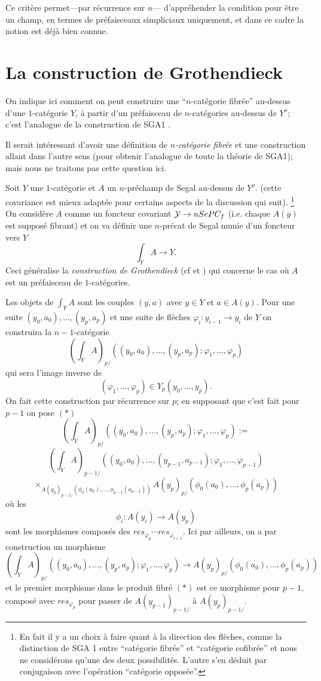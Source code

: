 \documentclass[12pt]{article}
\newcommand{\numero}[1]{\newpage\section{#1}}
\newcommand{\Yy}{{\cal Y}}
\begin{document}
Ce crit\`ere permet---par r\'ecurrence sur $n$--- d'appr\'ehender la condition
pour
\^etre un champ,  en termes de pr\'efaisceaux simpliciaux uniquement, et
dans ce cadre la
notion est d\'ej\`a bien connue.




\numero{La construction de Grothendieck}

\label{gropage}

On indique ici comment on peut construire une ``$n$-cat\'egorie fibr\'ee''
au-dessus
d'une $1$-cat\'egorie $Y$, \`a partir d'un pr\'efaisceau de $n$-cat\'egories
au-dessus de $Y^o$; c'est l'analogue de la construction de SGA1 \cite{SGA1}.

Il serait int\'eressant d'avoir une d\'efinition de
{\em $n$-cat\'egorie fibr\'ee} et une construction allant dans
l'autre sens (pour obtenir l'analogue de toute la th\'eorie de SGA1);
mais nous ne traitons pas cette question ici.

Soit $Y$ une $1$-cat\'egorie et
$A$ un $n$-pr\'echamp de Segal au-dessus de $Y^o$.
(cette covariance
est mieux adapt\'ee pour
certains aspects de la discussion
qui suit).
\footnote{En fait il y a un choix \`a faire quant \`a la direction des
fl\`eches, comme la distinction de SGA 1 entre ``cat\'egorie fibr\'ee'' et
``cat\'egorie cofibr\'ee'' et nous ne consid\'erons qu'une des
deux possibilit\'es.
L'autre s'en d\'eduit par conjugaison avec l'op\'eration
``cat\'egorie oppos\'ee''.}
On consid\`ere $A$ comme un foncteur covariant $\Yy
\rightarrow nSePC_f$ (i.e. chaque $A(y)$ est suppos\'e fibrant) et on va
d\'efinir une $n$-pr\'ecat de Segal munie d'un foncteur vers $Y$
$$
\int _YA \rightarrow Y.
$$
Ceci g\'en\'eralise la {\em
construction de Grothendieck} (cf \cite{ThomasonLimits} et \cite{DwyerKan2}) qui
concerne le cas o\`u $A$ est un pr\'efaisceau de $1$-cat\'egories.

Les objets de $\int _YA$ sont les couples $(y,a)$ avec $y\in Y$ et
$a\in A(y)$. Pour une suite $(y_0,a_0),\ldots , (y_p,a_p)$
et une suite de fl\`eches $\varphi _i : y_{i-1}\rightarrow y_i$ de $Y$ on
construira la $n-1$-cat\'egorie
$$
(\int _YA)_{p/}((y_0,a_0),\ldots , (y_p,a_p); \varphi _1,\ldots , \varphi _p)
$$
qui sera l'image inverse de
$$
(\varphi _1,\ldots , \varphi _p)\in Y_{p}(y_0,\ldots , y_p).
$$
On fait cette construction par r\'ecurrence sur $p$; en supposant que c'est fait
pour $p-1$ on pose $(\ast )$
$$
(\int _YA)_{p/}((y_0,a_0),\ldots , (y_p,a_p); \varphi _1,\ldots , \varphi _p)
:=
$$
$$
(\int _YA)_{p-1/}((y_0,a_0),\ldots , (y_{p-1},a_{p-1});
\varphi _1,\ldots , \varphi
_{p-1})
$$
$$
\times _{A(y_{p})_{p-1/}(\phi _0(a_0), \ldots , \phi _{p-1}(a_{p-1}))}
A(y_{p})_{p/}(\phi _0(a_0), \ldots , \phi _{p}(a_{p}))
$$
o\`u les
$$
\phi _i : A(y_i)\rightarrow A(y_p)
$$
sont les morphismes compos\'es des $res_{\varphi _p}\cdots res _{\varphi
_{i+1}}$. Ici par ailleurs, on a par construction un morphisme
$$
(\int _YA)_{p/}((y_0,a_0),\ldots , (y_p,a_p); \varphi _1,\ldots , \varphi _p)
\rightarrow
A(y_{p})_{p/}(\phi _0(a_0), \ldots , \phi _{p}(a_{p}))
$$
et le premier morphisme dans le produit fibr\'e $(\ast )$ est ce morphisme pour
$p-1$, compos\'e avec $res_{\varphi _p}$ pour passer de $A(y_{p-1})_{p-1/}$ \`a
$A(y_p)_{p-1/}$.
\end{document}
